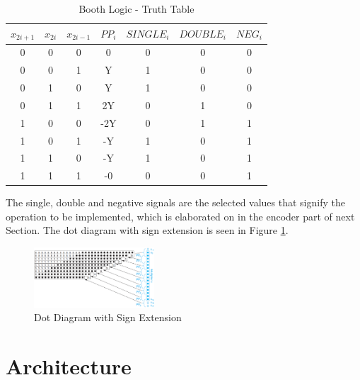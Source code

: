 \documentclass[journal]{IEEEtran}
\begin{document}
\begin{table}[!h]
\renewcommand{\arraystretch}{1.2}
\caption{Booth Logic - Truth Table}
\label{tab:t1}
\centering
\begin{tabular}{| c | c | c | c | c | c | c |}
\hline
$x_{2i+1}$ & $x_{2i}$  &  $x_{2i-1}$ & $PP_{i}$ & $SINGLE_{i}$ &
$DOUBLE_{i}$ & $NEG_{i}$\\\hline
0 & 0 & 0 & 0 & 0 & 0 & 0\\\hline
0 & 0 & 1 & Y & 1 & 0 & 0\\\hline
0 & 1 & 0 & Y & 1 & 0 & 0\\\hline
0 & 1 & 1 & 2Y & 0 & 1 & 0\\\hline
1 & 0 & 0 & -2Y & 0 & 1 & 1\\\hline
1 & 0 & 1 & -Y & 1 & 0 & 1\\\hline
1 & 1 & 0 & -Y & 1 & 0 & 1\\\hline
1 & 1 & 1 & -0 & 0 & 0 & 1\\\hline
\end{tabular}
\end{table}



The single, double and negative signals are the selected values that signify the operation to be implemented, which is elaborated on in the encoder part of next Section. The dot diagram with sign extension is seen in Figure
\ref{fig:2}.

\begin{figure}[h!]
  \centering
  \includegraphics[width=0.4\textwidth]{2.png}
  \centering
  \caption{Dot Diagram with Sign Extension \cite{tb}}
  \label{fig:2}
\end{figure}


\section{Architecture}
\end{document}
